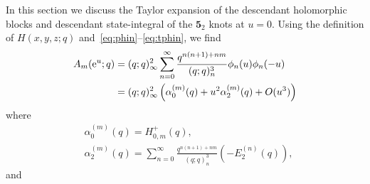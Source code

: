 \documentclass[12pt,reqno]{amsart}
\theoremstyle{definition}
\def\tq{\tilde{q}}
\def\tx{\tilde{x}}
\def\bb{\mathsf{b}}
\def\ri{\mathrm{i}}
\def\tx{\tilde{x}}
\def\re{{\rm e}}
\def\ri{{\rm i}}
\def\md{\mathbf}
\def\cA{\mathcal{A}}
\def\cB{\mathcal{B}}
\def\cC{\mathcal{C}}
\newcommand{\knot}[1]{\md{#1}}
\newcommand{\nn}{\nonumber \\}
\begin{document}
In this section we discuss the Taylor expansion of the descendant
holomorphic blocks and descendant state-integral of the $\knot{5}_2$
knots at $u=0$.  
Using the definition of $H(x,y,z;q)$
and~\eqref{eq:phin}--\eqref{eq:tphin}, we find
\begin{align}
  A_m(\re^u;q)
  &= (q;q)_\infty^2
    \sum_{n=0}^\infty \frac{q^{n(n+1)+nm}}{(q;q)_n^3}
    \phi_n(u) \phi_n(-u)
    \nn
  &= (q;q)_\infty^2
    \left(\alpha^{(m)}_0(q)+u^2\alpha^{(m)}_2(q)+O(u^3)\right)
    \label{eq:A-uexp-52}
\end{align}
where
\begin{align}
  &\alpha^{(m)}_0(q) = H^{+}_{0,m}(q),\label{eq:a0-52}\\
  &\alpha^{(m)}_2(q) =
    \sum_{n=0}^\infty \frac{q^{n(n+1)+nm}}{(q;q)_n^3}
    (-E_2^{(n)}(q)),\label{eq:a2-52}
\end{align}
and
\end{document}
